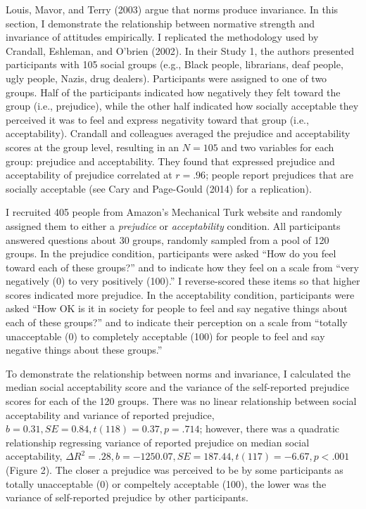 \documentclass[english,man]{apa6}
\newcounter{author}
\theoremstyle{definition}
\theoremstyle{definition}
\theoremstyle{remark}
\begin{document}
Louis, Mavor, and Terry (2003) argue that norms produce invariance. In
this section, I demonstrate the relationship between normative strength
and invariance of attitudes empirically. I replicated the methodology
used by Crandall, Eshleman, and O'brien (2002). In their Study 1, the
authors presented participants with 105 social groups (e.g., Black
people, librarians, deaf people, ugly people, Nazis, drug dealers).
Participants were assigned to one of two groups. Half of the
participants indicated how negatively they felt toward the group (i.e.,
prejudice), while the other half indicated how socially acceptable they
perceived it was to feel and express negativity toward that group (i.e.,
acceptability). Crandall and colleagues averaged the prejudice and
acceptability scores at the group level, resulting in an \(N = 105\) and
two variables for each group: prejudice and acceptability. They found
that expressed prejudice and acceptability of prejudice correlated at
\(r = .96\); people report prejudices that are socially acceptable (see
Cary and Page-Gould (2014) for a replication).

I recruited 405 people from Amazon's Mechanical Turk website and
randomly assigned them to either a \emph{prejudice} or
\emph{acceptability} condition. All participants answered questions
about 30 groups, randomly sampled from a pool of 120 groups. In the
prejudice condition, participants were asked \enquote{How do you feel
toward each of these groups?} and to indicate how they feel on a scale
from \enquote{very negatively (0) to very positively (100).} I
reverse-scored these items so that higher scores indicated more
prejudice. In the acceptability condition, participants were asked
\enquote{How OK is it in society for people to feel and say negative
things about each of these groups?} and to indicate their perception on
a scale from \enquote{totally unacceptable (0) to completely acceptable
(100) for people to feel and say negative things about these groups.}

To demonstrate the relationship between norms and invariance, I
calculated the median social acceptability score and the variance of the
self-reported prejudice scores for each of the 120 groups. There was no
linear relationship between social acceptability and variance of
reported prejudice, \(b = 0.31, SE = 0.84, t(118) = 0.37, p = .714\);
however, there was a quadratic relationship regressing variance of
reported prejudice on median social acceptability,
\(\Delta R^2 = .28, b = -1250.07, SE = 187.44, t(117) = -6.67, p < .001\)
(Figure 2). The closer a prejudice was perceived to be by some
participants as totally unacceptable (0) or compeltely acceptable (100),
the lower was the variance of self-reported prejudice by other
participants.
\end{document}

